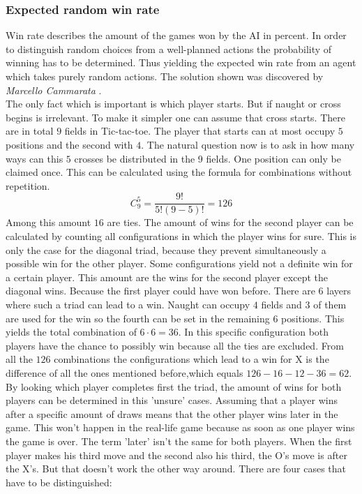 \documentclass[12pt]{article}
\begin{document}
\subsubsection{Expected random win rate}
Win rate describes the amount of the games won by the AI in percent.
In order to distinguish random choices from a well-planned actions the probability of winning has to be determined. Thus yielding the expected win rate from an agent which takes purely random actions.
The solution shown was discovered by \textit{Marcello Cammarata} \cite{tic_tac_toe_prob}. 
\\ The only fact which is important is which player starts. But if naught or cross begins is irrelevant. To make it simpler one can assume that cross starts. There are in total $9$ fields in Tic-tac-toe. The player that starts can at most occupy $5$ positions and the second with $4$. The natural question now is to ask in how many ways can this $5$ crosses be distributed in the 9 fields. One position can only be claimed once. This can be calculated using the formula for combinations without repetition.\cite{comb}
\begin{equation}\nonumber
    C^{5}_{9} = \frac{9!}{5!(9-5)!} = 126
\end{equation}
Among this amount $16$ are ties. The amount of wins for the second player can be calculated by counting all configurations in which the player wins for sure. This is only the case for the diagonal triad, because they prevent simultaneously a possible win for the other player. Some configurations yield not a definite win for a certain player. This amount are the wins for the second player except the diagonal wins. Because the first player could have won before. There are $6$ layers where such a triad can lead to a win. Naught can occupy $4$ fields and $3$ of them are used for the win so the fourth can be set in the remaining $6$ positions. This yields the total combination of $6 \cdot 6 = 36$. In this specific configuration both players have the chance to possibly win because all the ties are excluded.
From all the $126$ combinations the configurations which lead to a win for X is the difference of all the ones mentioned before,which equals $126 -  16 - 12 - 36 = 62 $.\\
By looking which player completes first the triad, the amount of wins for both players can be determined in this 'unsure' cases. Assuming that a player wins after a specific amount of draws means that the other player wins later in the game. This won't happen in the real-life game because as soon as one player wins the game is over. The term 'later' isn't the same for both players. When the first player makes his third move and the second also his third, the O's move is after the X's. But that doesn't work the other way around. There are four cases that have to be distinguished:
\end{document}
